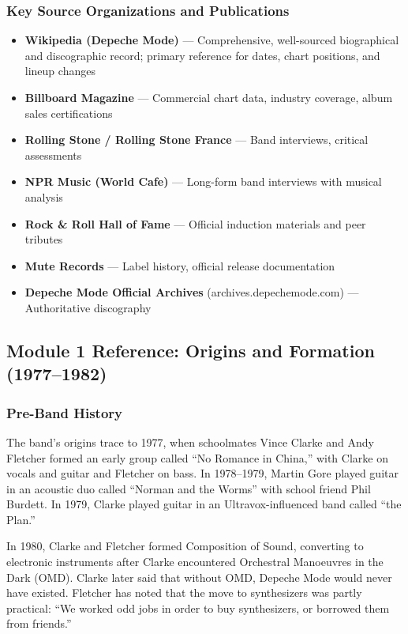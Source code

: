 \documentclass[11pt,letterpaper]{article}
\begin{document}
\subsubsection{Key Source Organizations and Publications}
\begin{itemize}
  \item \textbf{Wikipedia (Depeche Mode)} --- Comprehensive, well-sourced biographical and discographic record; primary reference for dates, chart positions, and lineup changes
  \item \textbf{Billboard Magazine} --- Commercial chart data, industry coverage, album sales certifications
  \item \textbf{Rolling Stone / Rolling Stone France} --- Band interviews, critical assessments
  \item \textbf{NPR Music (World Cafe)} --- Long-form band interviews with musical analysis
  \item \textbf{Rock \& Roll Hall of Fame} --- Official induction materials and peer tributes
  \item \textbf{Mute Records} --- Label history, official release documentation
  \item \textbf{Depeche Mode Official Archives} (archives.depechemode.com) --- Authoritative discography
\end{itemize}

\subsection{Module 1 Reference: Origins and Formation (1977--1982)}

\subsubsection{Pre-Band History}

The band's origins trace to 1977, when schoolmates Vince Clarke and Andy Fletcher formed an early group called ``No Romance in China,'' with Clarke on vocals and guitar and Fletcher on bass. In 1978--1979, Martin Gore played guitar in an acoustic duo called ``Norman and the Worms'' with school friend Phil Burdett. In 1979, Clarke played guitar in an Ultravox-influenced band called ``the Plan.''

In 1980, Clarke and Fletcher formed Composition of Sound, converting to electronic instruments after Clarke encountered Orchestral Manoeuvres in the Dark (OMD). Clarke later said that without OMD, Depeche Mode would never have existed. Fletcher has noted that the move to synthesizers was partly practical: ``We worked odd jobs in order to buy synthesizers, or borrowed them from friends.''
\end{document}
